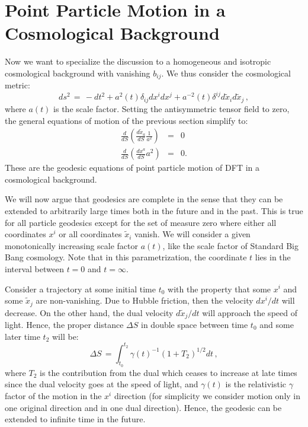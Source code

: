 \documentclass[prd, aps, superscriptaddress, preprintnumbers, twocolumn, floatfix, nofootinbib]{revtex4}
\begin{document}
\section{Point Particle Motion in a Cosmological Background}

Now we want to specialize the discussion to a homogeneous and isotropic cosmological background
with vanishing $b_{ij}$. We thus consider the cosmological metric:
\begin{equation} \label{metricCOSMO}
ds^2 \, = \, - dt^2 + a^2(t) \delta_{ij} dx^i dx^j + a^{-2}(t)\delta^{ij} d\tilde{x}_i d\tilde{x}_j\, ,
\end{equation}
where $a(t)$ is the scale factor. Setting the antisymmetric tensor field to zero, the general equations of motion of the previous section simplify to:
\begin{eqnarray}
\frac{d}{dS}\left(\frac{d\tilde{x}_{a}}{dS}\frac{1}{a^2}\right) & = & 0\\
\frac{d}{dS}\left(\frac{dx^{a}}{dS}a^{2}\right) & = & 0.
\end{eqnarray}
These are the geodesic equations of point particle motion of DFT in a cosmological
background.

We will now argue that geodesics are complete in the sense that they
can be extended to arbitrarily large times both in the future and in the past. This is
true for all particle geodesics except for the set of measure zero where either
all coordinates $x^i$ or all coordinates ${\tilde x}_i$ vanish. We will consider
a given monotonically increasing scale factor $a(t)$, like the scale factor of
Standard Big Bang cosmology. Note that in this parametrization, the coordinate
$t$ lies in the interval between $t = 0$ and $t = \infty$.

Consider a trajectory at some initial time $t_0$ with the property that some $x^i$ and
some ${\tilde x}_j$ are non-vanishing. Due to Hubble friction, then the velocity
$dx^i / dt$ will decrease. On the other hand, the dual velocity $d{\tilde x}_j / dt$
will approach the speed of light. Hence, the proper distance $\Delta S$ in double space
between time $t_0$ and some later time $t_2$ will be:
\begin{equation}
\Delta S \, = \int_{t_0}^{t_2} \gamma(t)^{-1} (1 + T_2)^{1/2} dt  \, ,
\end{equation}
where $T_2$ is the contribution from the dual which ceases to increase at
late times since the dual velocity goes at the speed of light, and $\gamma(t)$ is
the relativistic $\gamma$ factor of the motion in the $x^i$ direction (for simplicity
we consider motion only in one original direction and in one dual direction).
Hence, the geodesic can be extended to infinite time in the future.
\end{document}
